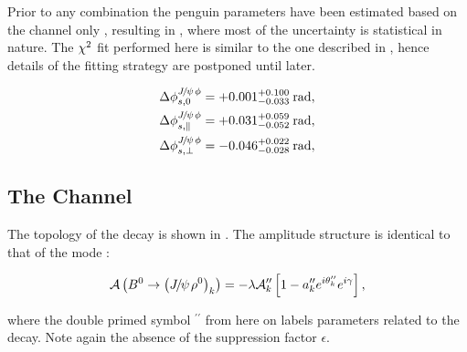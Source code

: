 
Prior to any combination the penguin parameters have been estimated based on
the \BsJpsiKst channel only \cite{bsjpsikst-paper}, resulting in ,
where most of the uncertainty is statistical in nature. The $\chi^2$ fit performed here is similar
to the one described in , hence details of the fitting strategy are postponed until later.

\begin{subequations}
  \label{delta_phis_jpsikst}
  \begin{align}
    \Delta\phi^{{J\mskip -3mu/\mskip -2mu\psi\mskip 2mu}\phi}_{s,{0}}         & = +0.001^{+0.100}_{-0.033} \:\text{rad},\\
    \Delta\phi^{{J\mskip -3mu/\mskip -2mu\psi\mskip 2mu}\phi}_{s,{\parallel}} & = +0.031^{+0.059}_{-0.052} \:\text{rad},\\
    \Delta\phi^{{J\mskip -3mu/\mskip -2mu\psi\mskip 2mu}\phi}_{s,{\perp}}     & = -0.046^{+0.022}_{-0.028} \:\text{rad},
  \end{align}
\end{subequations}

\subsection{The \BdJpsiRho Channel}
\label{bsjpsirho_chanell}

The topology of the \BdJpsiRho decay is shown in .
The amplitude structure is identical to that of the \BsJpsiKst mode \cite{Fleischer:1999zi}:

\begin{equation}
  \mathcal{A} \left( B^0\rightarrow \left({J\mskip -3mu/\mskip -2mu\psi\mskip 2mu} \rho^0\right)_{k} \right) = -\lambda \mathcal{A}_{k}'' \left[  1 - a_k'' e^{i\theta_k''} e^{i\gamma}  \right],
  \label{bsjpsirho_amp}
\end{equation}

\noindent where the double primed symbol ${}^{\prime\prime}$ from here on labels parameters related to the \BdJpsiRho decay.
Note again the absence of the suppression factor $\epsilon$.


